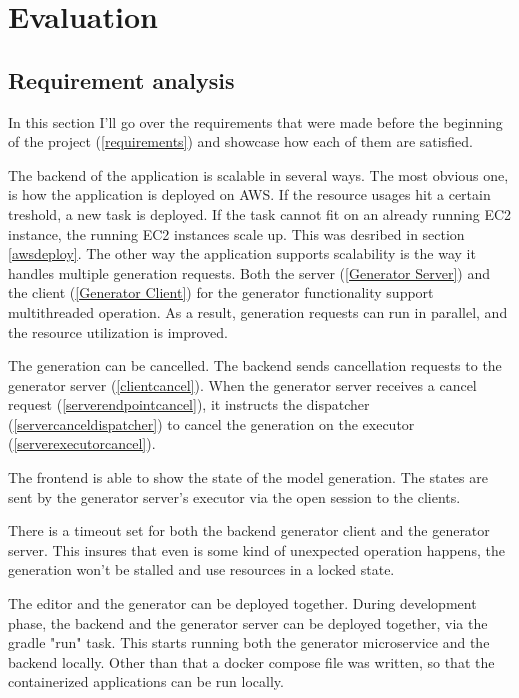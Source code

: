 \chapter{Evaluation}\label{Evaluation}

	\section{Requirement analysis}
	In this section I'll go over the requirements that were made before the beginning of the project (\ref{requirements}) 
	and showcase how each of them are satisfied.

	The backend of the application is scalable in several ways. The most obvious one, is how the application is deployed on AWS. 
	If the resource usages hit a certain treshold, a new task is deployed. If the task cannot fit on an already running EC2 instance,
	the running EC2 instances scale up. This was desribed in section \ref{awsdeploy}. The other way the application supports 
	scalability is the way it handles multiple generation requests. Both the server (\ref{Generator Server}) and the client
	(\ref{Generator Client}) for the generator 
	functionality support multithreaded operation. As a result, generation requests can run in parallel, and the resource utilization
	is improved.

	The generation can be cancelled. The backend sends cancellation requests to the generator server (\ref{clientcancel}).
	When the generator server receives a cancel request (\ref{serverendpointcancel}), it instructs the dispatcher 
	(\ref{servercanceldispatcher}) to cancel the generation on the executor (\ref{serverexecutorcancel}).

	The frontend is able to show the state of the model generation. The states are sent by the generator server's executor via
	the open session to the clients.

	There is a timeout set for both the backend generator client and the generator server. This insures that even is some kind of 
	unexpected operation happens, the generation won't be stalled and use resources in a locked state.

	The editor and the generator can be deployed together. During development phase, the backend and the generator server can be 
	deployed together, via the gradle "run" task. This starts running both the generator microservice and the backend locally.
	Other than that a docker compose file was written, so that the containerized applications can be run locally.

